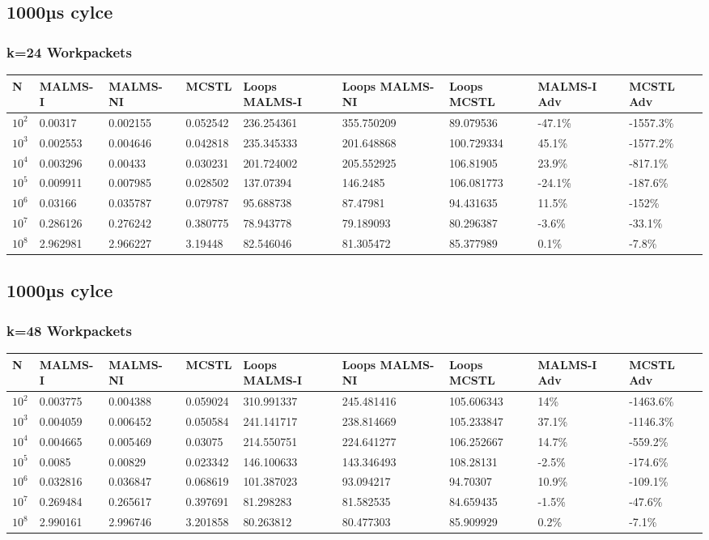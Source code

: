 \documentclass[landscape]{article}
\begin{document}
\subsection*{1000µs cylce}
\subsubsection{k=24 Workpackets}
\begin{tabular}{l|l|l|l|l|l|l|l|l}
N	& MALMS-I 	& MALMS-NI	& MCSTL		& Loops MALMS-I	& Loops MALMS-NI & Loops MCSTL & MALMS-I Adv	& MCSTL Adv		\\
\hline
$10^2$		& 0.00317	& 0.002155	& 0.052542	& 236.254361	& 355.750209	& 89.079536	& -47.1\%  	& -1557.3\% \\
$10^3$		& 0.002553	& 0.004646	& 0.042818	& 235.345333	& 201.648868	& 100.729334	& 45.1\%  	& -1577.2\% \\
$10^4$		& 0.003296	& 0.00433	& 0.030231	& 201.724002	& 205.552925	& 106.81905	& 23.9\%  	& -817.1\% \\
$10^5$		& 0.009911	& 0.007985	& 0.028502	& 137.07394	& 146.2485	& 106.081773	& -24.1\%  	& -187.6\% \\
$10^6$		& 0.03166	& 0.035787	& 0.079787	& 95.688738	& 87.47981	& 94.431635	& 11.5\%  	& -152\% \\
$10^7$		& 0.286126	& 0.276242	& 0.380775	& 78.943778	& 79.189093	& 80.296387	& -3.6\%  	& -33.1\% \\
$10^8$		& 2.962981	& 2.966227	& 3.19448	& 82.546046	& 81.305472	& 85.377989	& 0.1\%  	& -7.8\% \\
\end{tabular}
\subsection*{1000µs cylce}
\subsubsection{k=48 Workpackets}
\begin{tabular}{l|l|l|l|l|l|l|l|l}
N	& MALMS-I 	& MALMS-NI	& MCSTL		& Loops MALMS-I	& Loops MALMS-NI & Loops MCSTL & MALMS-I Adv	& MCSTL Adv		\\
\hline
$10^2$		& 0.003775	& 0.004388	& 0.059024	& 310.991337	& 245.481416	& 105.606343	& 14\%  	& -1463.6\% \\
$10^3$		& 0.004059	& 0.006452	& 0.050584	& 241.141717	& 238.814669	& 105.233847	& 37.1\%  	& -1146.3\% \\
$10^4$		& 0.004665	& 0.005469	& 0.03075	& 214.550751	& 224.641277	& 106.252667	& 14.7\%  	& -559.2\% \\
$10^5$		& 0.0085	& 0.00829	& 0.023342	& 146.100633	& 143.346493	& 108.28131	& -2.5\%  	& -174.6\% \\
$10^6$		& 0.032816	& 0.036847	& 0.068619	& 101.387023	& 93.094217	& 94.70307	& 10.9\%  	& -109.1\% \\
$10^7$		& 0.269484	& 0.265617	& 0.397691	& 81.298283	& 81.582535	& 84.659435	& -1.5\%  	& -47.6\% \\
$10^8$		& 2.990161	& 2.996746	& 3.201858	& 80.263812	& 80.477303	& 85.909929	& 0.2\%  	& -7.1\% \\
\end{tabular}
\end{document}
